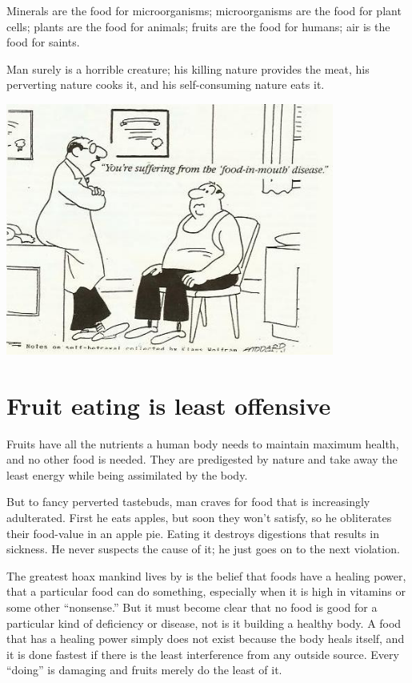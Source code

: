 \documentclass[landscape,twocolumn,letterpaper]{article}
\begin{document}
Minerals are the food for microorganisms; microorganisms are the food
for plant cells; plants are the food for animals; fruits are the food
for humans; air is the food for saints.

Man surely is a horrible creature; his killing nature provides the
meat, his perverting nature cooks it, and his self-consuming nature
eats it.




\includegraphics[width=4.25in,bb=0 0 470 359]{p7.jpg}





\section{Fruit eating is least offensive}

Fruits have all the nutrients a human body needs to maintain maximum
health, and no other food is needed. They are predigested by nature
and take away the least energy while being assimilated by the body.

But to fancy perverted tastebuds, man craves for food that is
increasingly adulterated. First he eats apples, but soon they won't
satisfy, so he obliterates their food-value in an apple pie. Eating it
destroys digestions that results in sickness. He never suspects the
cause of it; he just goes on to the next violation.

The greatest hoax mankind lives by is the belief that foods have a
healing power, that a particular food can do something, especially
when it is high in vitamins or some other ``nonsense.'' But it must
become clear that no food is good for a particular kind of deficiency
or disease, not is it building a healthy body. A food that has a
healing power simply does not exist because the body heals itself, and
it is done fastest if there is the least interference from any outside
source. Every ``doing'' is damaging and fruits merely do the least of
it.
\end{document}
